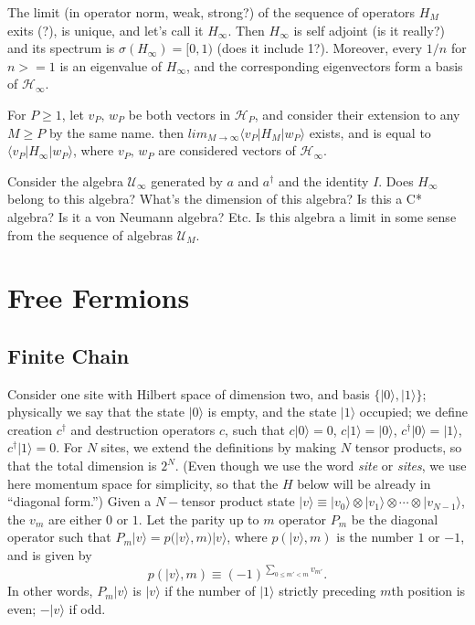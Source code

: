 	
	The limit (in operator norm, weak, strong?) of the sequence of operators $H_M$ exits (?), is unique, and let's call it $H_\infty$.
	Then $H_\infty$ is self adjoint (is it really?) and its spectrum is $\sigma(H_\infty) = [0, 1)$ (does it include 1?).
    Moreover, every $1/n$ for $n>=1$ is an eigenvalue of $H_\infty$, and the corresponding eigenvectors form a basis of $\mathcal{H}_\infty$.
    
	For $P\ge 1$, let  $v_P,\,w_P$ be both vectors in $\mathcal{H}_P$, and consider their extension to any $M\ge P$ by the same name. 
	then $lim_{M\rightarrow\infty} \langle v_P | H_M | w_P\rangle$ exists, and is equal to
	$\langle v_P | H_\infty | w_P\rangle$, where $v_P,\,w_P$ are considered vectors of $\mathcal{H}_\infty$.
	
Consider the algebra $\mathcal{U}_\infty$ generated by $a$ and $a^\dagger$ and the identity $I$. Does $H_\infty$ belong to this algebra?
What's the dimension of this algebra? Is this a C* algebra? Is it a von Neumann algebra? Etc.
	Is this algebra a limit in some sense from the sequence of algebras $\mathcal{U}_M$.
	
	\section{Free Fermions}
	\subsection{Finite Chain}
	Consider one site with Hilbert space of dimension two,  and basis $\{|0\rangle, |1\rangle\}$; physically we say
	that the state $|0\rangle$ is empty, and the state $|1\rangle$ occupied;
	we define creation $c^\dagger$ and destruction operators $c$,
	such that $c|0\rangle=0$, $c|1\rangle=|0\rangle$, $c^\dagger|0\rangle=|1\rangle$, $c^\dagger|1\rangle=0$.
	For $N$ sites, we extend the definitions by making $N$ tensor products, so that the total dimension is $2^N$.
	(Even though we use the word \emph{site} or \emph{sites}, we use here momentum space for simplicity, 
	so that the $H$ below will be already in ``diagonal form.'')
	Given a $N-$tensor product state $|v\rangle\equiv|v_0\rangle\otimes|v_1\rangle\otimes\cdots\otimes|v_{N-1}\rangle$, 
	the $v_m$ are either $0$ or $1$. Let the parity up to 
	$m$ operator $P_m$ be the diagonal operator such that  $P_m|v\rangle = p(|v\rangle, m)|v\rangle$, where
	$p(|v\rangle, m)$ is the number $1$ or $-1$, and is given by 
	\begin{equation}
	p(|v\rangle, m)\equiv(-1)^{\sum_{0\le m'<m} v_{m'}}.
	\end{equation}
	In other words, $P_m |v \rangle$ is $|v\rangle$ if the number of $|1\rangle$ strictly preceding $m$th position is even; $-|v\rangle$ if odd.
	
